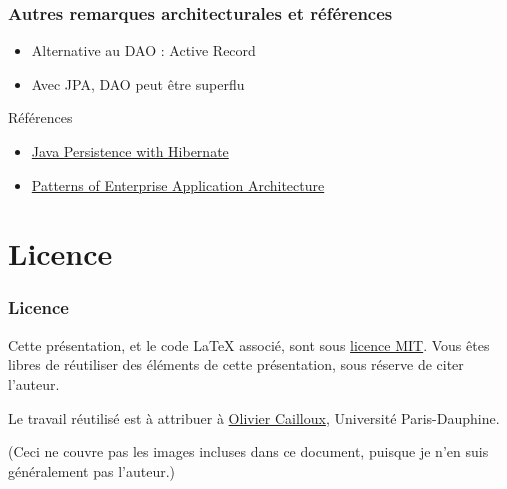 \documentclass[english, french]{beamer}
\begin{document}
\begin{frame}
	\frametitle{Autres remarques architecturales et références}
	\begin{itemize}
		\item Alternative au DAO : Active Record
		\item Avec JPA, DAO peut être superflu
	\end{itemize}
	\begin{block}{Références}
		\begin{itemize}
			\item \href{http://gen.lib.rus.ec/book/index.php?md5=5D9F8BC8761804C0EBB8FE6A60BCF817}{Java Persistence with Hibernate}
			\item \href{http://gen.lib.rus.ec/book/index.php?md5=37E9F4F25E3C5609E14415472408B80C}{Patterns of Enterprise Application Architecture}
		\end{itemize}
	\end{block}
\end{frame}

\section{Licence}
\begin{frame}
	\frametitle{Licence}
	Cette présentation, et le code LaTeX associé, sont sous \href{http://opensource.org/licenses/MIT}{licence MIT}. Vous êtes libres de réutiliser des éléments de cette présentation, sous réserve de citer l’auteur.
	
	Le travail réutilisé est à attribuer à \href{http://www.lamsade.dauphine.fr/~ocailloux/}{Olivier Cailloux}, Université Paris-Dauphine.
	
	\small{(Ceci ne couvre pas les images incluses dans ce document, puisque je n’en suis généralement pas l’auteur.)}
\end{frame}
\end{document}
